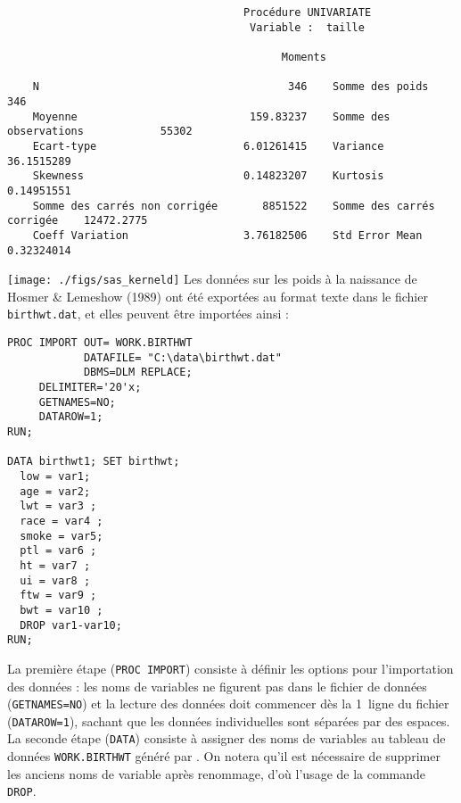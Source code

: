 \begin{verbatim}
                                     Procédure UNIVARIATE
                                      Variable :  taille

                                           Moments

    N                                       346    Somme des poids                     346
    Moyenne                           159.83237    Somme des observations            55302
    Ecart-type                       6.01261415    Variance                     36.1515289
    Skewness                         0.14823207    Kurtosis                     0.14951551
    Somme des carrés non corrigée       8851522    Somme des carrés corrigée    12472.2775
    Coeff Variation                  3.76182506    Std Error Mean               0.32324014
\end{verbatim}

\texttt{[image: ./figs/sas\_kerneld]}
%
%
%
\soln{\ref{exo:8.6}}
Les données sur les poids à la naissance de Hosmer \& Lemeshow (1989) ont
été exportées au format texte dans le fichier \texttt{birthwt.dat}, et elles
peuvent être importées ainsi :
\begin{verbatim}
PROC IMPORT OUT= WORK.BIRTHWT
            DATAFILE= "C:\data\birthwt.dat"
            DBMS=DLM REPLACE;
     DELIMITER='20'x;
     GETNAMES=NO;
     DATAROW=1;
RUN;

DATA birthwt1; SET birthwt;
  low = var1;
  age = var2;
  lwt = var3 ;
  race = var4 ;
  smoke = var5;
  ptl = var6 ;
  ht = var7 ;
  ui = var8 ;
  ftw = var9 ;
  bwt = var10 ;
  DROP var1-var10;
RUN;
\end{verbatim}
La première étape (\texttt{PROC IMPORT}) consiste à définir les options pour
l'importation des données : les noms de variables ne figurent pas dans le
fichier de données (\texttt{GETNAMES=NO}) et la lecture des données doit
commencer dès la 1\iere\ ligne du fichier (\texttt{DATAROW=1}), sachant que
les données individuelles sont séparées par des espaces. La seconde étape
(\texttt{DATA}) consiste à assigner des noms de variables au tableau de
données \texttt{WORK.BIRTHWT} généré par \SAS. On notera qu'il est
nécessaire de supprimer les anciens noms de variable après renommage, d'où
l'usage de la commande \texttt{DROP}.

